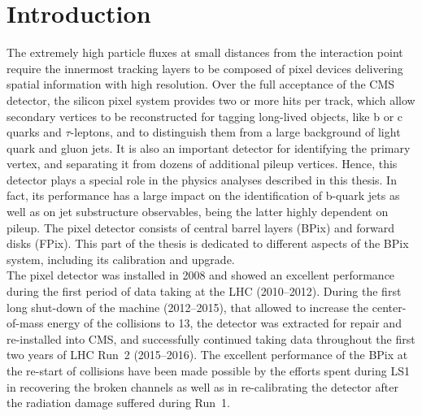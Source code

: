 \chapter{Introduction}\label{ch:BPixIntro}

The extremely high particle fluxes at small distances from the interaction point require the innermost tracking layers to be composed of pixel devices delivering spatial information with high resolution.
Over the full acceptance of the CMS detector, the silicon pixel system provides two or more hits per track, which allow secondary vertices to be reconstructed for tagging long-lived objects, like b or c quarks and $\tau$-leptons, and to distinguish them from a large background of light quark and gluon jets. It is also an important detector for identifying the primary vertex, and separating it from dozens of additional pileup vertices.
Hence, this detector plays a special role in the physics analyses described in this thesis. In fact, its performance has a large impact on the identification of b-quark jets as well as on jet substructure observables, being the latter highly dependent on pileup.
The pixel detector consists of central barrel layers (BPix) and forward disks (FPix).
This part of the thesis is dedicated to different aspects of the BPix system, including its calibration and upgrade.\\ 

The pixel detector was installed in 2008 and showed an excellent performance during the first period of data taking at the LHC (2010--2012).
During the first long shut-down of the machine (2012--2015), that allowed to increase the center-of-mass energy of the collisions to 13\TeV, the detector was extracted for repair and re-installed into CMS, and successfully continued taking data throughout the first two years of LHC Run~2 (2015--2016). The excellent performance of the BPix at the re-start of collisions have been made possible by the efforts spent during LS1 in recovering the broken channels as well as in re-calibrating the detector after the radiation damage suffered during Run~1.

